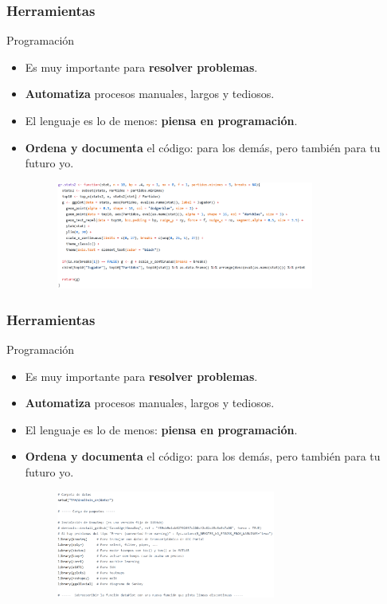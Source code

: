 \documentclass{beamer}
\begin{document}
\begin{frame}\frametitle{Herramientas}
	\begin{block}{Programación}
		\begin{itemize}
			\item Es muy importante para \textbf{resolver problemas}.
			\item \textbf{Automatiza} procesos manuales, largos y tediosos.
			\item El lenguaje es lo de menos: \textbf{piensa en programación}.
			\item \textbf{Ordena y documenta} el código: para los demás, pero también para tu futuro yo.
			\begin{figure}
				\centering
				\includegraphics[width=0.8\textwidth]{images/codigo_mal_comentado.png}
			\end{figure}
		\end{itemize}
	\end{block}
\end{frame}


\begin{frame}\frametitle{Herramientas}
	\begin{block}{Programación}
		\begin{itemize}
			\item Es muy importante para \textbf{resolver problemas}.
			\item \textbf{Automatiza} procesos manuales, largos y tediosos.
			\item El lenguaje es lo de menos: \textbf{piensa en programación}.
			\item \textbf{Ordena y documenta} el código: para los demás, pero también para tu futuro yo.
			\begin{figure}
				\centering
				\includegraphics[width=0.68\textwidth]{images/codigo_comentado.png}
			\end{figure}
		\end{itemize}
	\end{block}
\end{frame}
\end{document}
